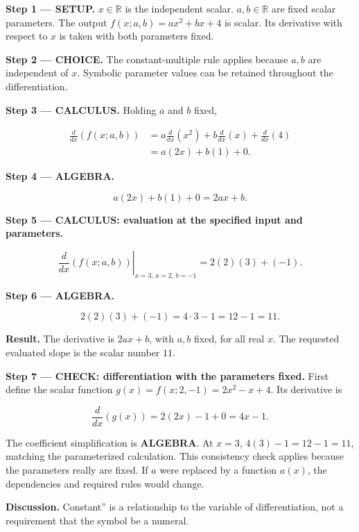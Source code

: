 \documentclass[11pt,oneside,openany]{book}
\begin{document}
\textbf{Step 1 --- SETUP.} \(x\in\mathbb R\) is the independent scalar.
\(a,b\in\mathbb R\) are fixed scalar parameters. The output \(f(x;a,b)=ax^2+bx+4\)
is scalar. Its derivative with respect to \(x\) is taken with both parameters fixed.

\begin{ChoiceStep}
\textbf{Step 2 --- CHOICE.} The constant-multiple rule applies because \(a,b\) are independent of \(x\).
Symbolic parameter values can be retained throughout the differentiation.

\end{ChoiceStep}
\textbf{Step 3 --- CALCULUS.} Holding \(a\) and \(b\) fixed,

\[
\begin{aligned}
\frac{d}{dx}\left(f(x;a,b)\right)
&=a\frac{d}{dx}\left(x^2\right)
+b\frac{d}{dx}\left(x\right)
+\frac{d}{dx}\left(4\right)\\
&=a(2x)+b(1)+0.
\end{aligned}
\]

\begingroup\color{AlgebraBlue}
\textbf{Step 4 --- ALGEBRA.}

\[
a(2x)+b(1)+0=2ax+b.
\]

\endgroup
\textbf{Step 5 --- CALCULUS: evaluation at the specified input and parameters.}

\[
\left.\frac{d}{dx}\left(f(x;a,b)\right)
\right|_{x=3,\,a=2,\,b=-1}
=2(2)(3)+(-1).
\]

\begingroup\color{AlgebraBlue}
\textbf{Step 6 --- ALGEBRA.}

\[
2(2)(3)+(-1)=4\cdot3-1=12-1=11.
\]

\endgroup
\textbf{Result.} The derivative is \(2ax+b\), with \(a,b\) fixed, for all real \(x\).
The requested evaluated slope is the scalar number \(11\).

\textbf{Step 7 --- CHECK: differentiation with the parameters fixed.} First define
the scalar function \(g(x)=f(x;2,-1)=2x^2-x+4\). Its derivative is

\[
\frac{d}{dx}\left(g(x)\right)=2(2x)-1+0=4x-1.
\]

The coefficient simplification is \textbf{ALGEBRA}. At \(x=3\), \(4(3)-1=12-1=11\),
matching the parameterized calculation. This consistency check applies because
the parameters really are fixed. If \(a\) were replaced by a function \(a(x)\), the
dependencies and required rules would change.

\textbf{Discussion.} \texttt{}Constant'' is a relationship to the variable of
differentiation, not a requirement that the symbol be a numeral.
\clearpage
\end{document}
